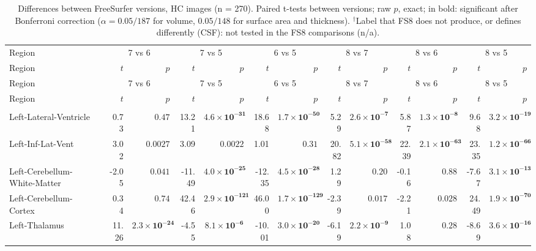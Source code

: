 {\scriptsize\setlength{\tabcolsep}{3pt}
\begin{longtable}{llrrrrrrrrrrrr}
\caption{Differences between FreeSurfer versions, HC images (n = 270). Paired t-tests between versions; raw $p$, exact; in bold: significant after Bonferroni correction ($\alpha = 0.05/187$ for volume, $0.05/148$ for surface area and thickness). $^{\dagger}$Label that FS8 does not produce, or defines differently (CSF): not tested in the FS8 comparisons (n/a).}\label{tab:S3}\\
\toprule
Region & & \multicolumn{2}{c}{7 vs 6} & \multicolumn{2}{c}{7 vs 5} & \multicolumn{2}{c}{6 vs 5} & \multicolumn{2}{c}{8 vs 7} & \multicolumn{2}{c}{8 vs 6} & \multicolumn{2}{c}{8 vs 5} \\
Region & & $t$ & $p$ & $t$ & $p$ & $t$ & $p$ & $t$ & $p$ & $t$ & $p$ & $t$ & $p$ \\
\midrule\endfirsthead
\toprule
Region & & \multicolumn{2}{c}{7 vs 6} & \multicolumn{2}{c}{7 vs 5} & \multicolumn{2}{c}{6 vs 5} & \multicolumn{2}{c}{8 vs 7} & \multicolumn{2}{c}{8 vs 6} & \multicolumn{2}{c}{8 vs 5} \\
Region & & $t$ & $p$ & $t$ & $p$ & $t$ & $p$ & $t$ & $p$ & $t$ & $p$ & $t$ & $p$ \\
\midrule\endhead
\bottomrule\endfoot
\midrule\multicolumn{14}{l}{\textbf{Volume (subcortical)}} \\
Left-Lateral-Ventricle &  & 0.73 & $0.47$ & 13.21 & $\mathbf{4.6{\times}10^{-31}}$ & 18.68 & $\mathbf{1.7{\times}10^{-50}}$ & 5.29 & $\mathbf{2.6{\times}10^{-7}}$ & 5.87 & $\mathbf{1.3{\times}10^{-8}}$ & 9.68 & $\mathbf{3.2{\times}10^{-19}}$ \\
Left-Inf-Lat-Vent &  & 3.02 & $0.0027$ & 3.09 & $0.0022$ & 1.01 & $0.31$ & 20.82 & $\mathbf{5.1{\times}10^{-58}}$ & 22.39 & $\mathbf{2.1{\times}10^{-63}}$ & 23.35 & $\mathbf{1.2{\times}10^{-66}}$ \\
Left-Cerebellum-White-Matter &  & -2.05 & $0.041$ & -11.49 & $\mathbf{4.0{\times}10^{-25}}$ & -12.35 & $\mathbf{4.5{\times}10^{-28}}$ & 1.29 & $0.20$ & -0.16 & $0.88$ & -7.67 & $\mathbf{3.1{\times}10^{-13}}$ \\
Left-Cerebellum-Cortex &  & 0.34 & $0.74$ & 42.46 & $\mathbf{2.9{\times}10^{-121}}$ & 46.00 & $\mathbf{1.7{\times}10^{-129}}$ & -2.39 & $0.017$ & -2.21 & $0.028$ & 24.49 & $\mathbf{1.9{\times}10^{-70}}$ \\
Left-Thalamus &  & 11.26 & $\mathbf{2.3{\times}10^{-24}}$ & -4.55 & $\mathbf{8.1{\times}10^{-6}}$ & -10.01 & $\mathbf{3.0{\times}10^{-20}}$ & -6.19 & $\mathbf{2.2{\times}10^{-9}}$ & 1.08 & $0.28$ & -8.69 & $\mathbf{3.6{\times}10^{-16}}$ \\

\end{longtable}}
